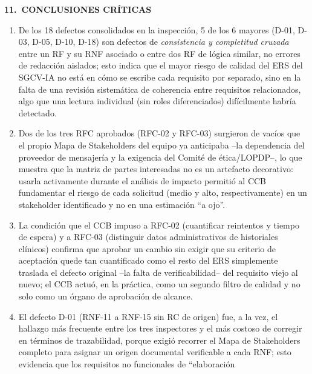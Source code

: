 \documentclass[11pt,a4paper]{article}
\newcommand{\seccion}[2]{%
  \vspace{0.6cm}
  \noindent
  {\color{white}\colorbox{uteqverde}{%
    \parbox[c][1.05cm]{\dimexpr\textwidth-16pt\relax}{%
      \hspace{6pt}\textbf{\large #1\ #2}%
    }%
  }}%
  \vspace{0.35cm}
  \par
}
\begin{document}
\seccion{11.}{CONCLUSIONES CRÍTICAS}

\begin{enumerate}
  \item De los 18 defectos consolidados en la inspección, 5 de los 6 mayores
  (D-01, D-03, D-05, D-10, D-18) son defectos de \emph{consistencia y
  completitud cruzada} entre un RF y su RNF asociado o entre dos RF de lógica
  similar, no errores de redacción aislados; esto indica que el mayor riesgo
  de calidad del ERS del SGCV-IA no está en cómo se escribe cada requisito por
  separado, sino en la falta de una revisión sistemática de coherencia entre
  requisitos relacionados, algo que una lectura individual (sin roles
  diferenciados) difícilmente habría detectado.
  \item Dos de los tres RFC aprobados (RFC-02 y RFC-03) surgieron de vacíos
  que el propio Mapa de Stakeholders del equipo ya anticipaba --la
  dependencia del proveedor de mensajería y la exigencia del Comité de
  ética/LOPDP--, lo que muestra que la matriz de partes interesadas no es un
  artefacto decorativo: usarla activamente durante el análisis de impacto
  permitió al CCB fundamentar el riesgo de cada solicitud (medio y alto,
  respectivamente) en un stakeholder identificado y no en una estimación
  ``a ojo''.
  \item La condición que el CCB impuso a RFC-02 (cuantificar reintentos y
  tiempo de espera) y a RFC-03 (distinguir datos administrativos de
  historiales clínicos) confirma que aprobar un cambio sin exigir que su
  criterio de aceptación quede tan cuantificado como el resto del ERS
  simplemente traslada el defecto original --la falta de verificabilidad-- del
  requisito viejo al nuevo; el CCB actuó, en la práctica, como un segundo
  filtro de calidad y no solo como un órgano de aprobación de alcance.
  \item El defecto D-01 (RNF-11 a RNF-15 sin RC de origen) fue, a la vez, el
  hallazgo más frecuente entre los tres inspectores y el más costoso de
  corregir en términos de trazabilidad, porque exigió recorrer el Mapa de
  Stakeholders completo para asignar un origen documental verificable a cada
  RNF; esto evidencia que los requisitos no funcionales de ``elaboración

\end{enumerate}
\end{document}
